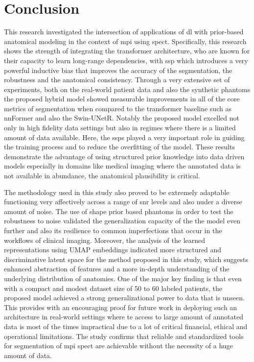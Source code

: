 \chapter{Conclusion}
\label{ch:conclusion}

This research investigated the intersection of applications of \gls{dl} with prior-based anatomical modeling in the context of \gls{mpi} using \gls{spect}. Specifically, this research shows the strength of integrating the transformer architecture, who are known for their capacity to learn long-range dependencies, with \gls{ssp} which introduces a very powerful inductive bias that improves the accuracy of the segmentation, the robustness and the anatomical consistency. Through a very extensive set of experiments, both on the real-world patient data and also the synthetic phantoms the proposed hybrid model showed measurable improvements in all of the core metrics of segmentation when compared to the transformer baseline such as nnFormer and also the Swin-UNetR. Notably the proposed model excelled not only in high fidelity data settings but also in regimes where there is a limited amount of data available. Here, the \gls{ssp}s played a very important role in guiding the training process and to reduce the overfitting of the model. These results demonstrate the advantage of using structured prior knowledge into data driven models especially in domains like medical imaging where the annotated data is not available in abundance, the anatomical plausibility is critical.

The methodology used in this study also proved to be extremely adaptable functioning very affectively across a range of \gls{snr} levels and also nuder a diverse amount of noise. The use of shape prior based phantoms in order to test the robustness to noise validated the generalization capacity of the the model even further and also its resilience to common imperfections that occur in the workflows of clinical imaging. Moreover, the analysis of the learned representations using UMAP embeddings indicated more structured and discriminative latent space for the method proposed in this study, which suggests enhanced abstraction of features and a more in-depth understanding of the underlying distribution of anatomies. One of the major key finding is that even with a compact and modest dataset size of 50 to 60 labeled patients, the proposed model achieved a strong generalizational power to data that is unseen. This provides with an encouraging proof for future work in deploying such an architecture in real-world settings where te access to large amount of annotated data is most of the times impractical due to a lot of critical financial, ethical and operational limitations. The study confirms that reliable and standardized tools for segmentation of \gls{mpi} \gls{spect} are achievable without the necessity of a huge amount of data.

